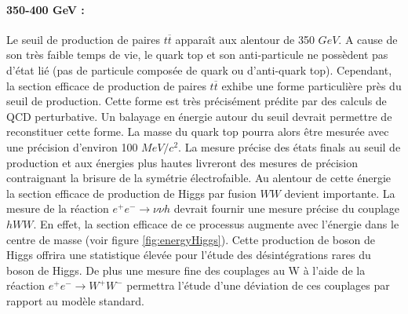    \paragraph{350-400 GeV :} Le seuil de production de paires $t\overline{t}$ apparaît aux alentour de 350 $GeV$. A cause de son très faible temps de vie, le quark top et son anti-particule ne poss\`edent pas d'\'etat li\'e (pas de particule compos\'ee de quark ou d'anti-quark top). Cependant, la section efficace de production de paires $t\overline{t}$ exhibe une forme particuli\`ere pr\`es du seuil de production. Cette forme est tr\`es pr\'ecis\'ement pr\'edite par des calculs de QCD perturbative. Un balayage en \'energie autour du seuil devrait permettre de reconstituer cette forme. La masse du quark top pourra alors \^etre mesur\'ee avec une pr\'ecision d'environ 100 $MeV/c^2$. La mesure pr\'ecise des \'etats finals au seuil de production et aux \'energies plus hautes livreront des mesures de pr\'ecision contraignant la brisure de la symétrie \'electrofaible. Au alentour de cette \'energie la section efficace de production de Higgs par fusion $WW$ devient importante. La mesure de la r\'eaction $e^+ e^- \rightarrow \nu \nu h$ devrait fournir une mesure pr\'ecise du couplage $hWW$. En effet, la section efficace de ce processus augmente avec l'\'energie dans le centre de masse (voir figure \ref{fig:energyHiggs}). Cette production de boson de Higgs offrira une statistique \'elev\'ee pour l'\'etude des d\'esint\'egrations rares du boson de Higgs. De plus une mesure fine des couplages au W \`a l'aide de la r\'eaction $e^+ e^- \rightarrow W^+ W^-$ permettra l'\'etude d'une d\'eviation de ces couplages par rapport au mod\`ele standard.
   
